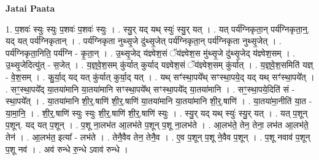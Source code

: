 \documentclass[17pt]{extarticle}
\begin{document}
\textbf{Jatai Paata} \newline

1. प॒शवः॑ स्युः स्युः प॒शवः॑ प॒शवः॑ स्युः । . स्यु॒र् यद् यथ् स्युः॑ स्यु॒र् यत् । . यत् पर्य॑ग्निकृता॒न् पर्य॑ग्निकृता॒न्॒. यद् यत् पर्य॑ग्निकृतान् । . पर्य॑ग्निकृता नुथ्सृ॒जे दु॑थ्सृ॒जेत् पर्य॑ग्निकृता॒न् पर्य॑ग्निकृता नुथ्सृ॒जेत् । . पर्य॑ग्निकृता॒निति॒ पर्य॑ग्नि - कृ॒ता॒न् । . उ॒थ्सृ॒जेद् य॑ज्ञ्वेश॒सं ॅय॑ज्ञ्वेश॒स मु॑थ्सृ॒जे दु॑थ्सृ॒जेद् य॑ज्ञ्वेश॒सम् । . उ॒थ्सृ॒जेदित्यु॑त् - स॒जेत् । . य॒ज्ञ्॒वे॒श॒सम् कु॑र्यात् कुर्याद् यज्ञ्वेश॒सं ॅय॑ज्ञ्वेश॒सम् कु॑र्यात् । . य॒ज्ञ्॒वे॒श॒समिति॑ यज्ञ् - वे॒श॒सम् । . कु॒र्या॒द् यद् यत् कु॑र्यात् कुर्या॒द् यत् । . यथ् सꣳ॑स्था॒पये᳚थ् सꣳस्था॒पये॒द् यद् यथ् सꣳ॑स्था॒पये᳚त् । . सꣳ॒॒स्था॒पये᳚द् या॒तया॑मानि या॒तया॑मानि सꣳस्था॒पये᳚थ् सꣳस्था॒पये᳚द् या॒तया॑मानि । . सꣳ॒॒स्था॒पये॒दिति॑ सं - स्था॒पये᳚त् । . या॒तया॑मानि शी॒र्॒.षाणि॑ शी॒र्॒.षाणि॑ या॒तया॑मानि या॒तया॑मानि शी॒र्॒.षाणि॑ । . या॒तया॑मा॒नीति॑ या॒त - या॒मा॒नि॒ । . शी॒र्॒.षाणि॑ स्युः स्युः शी॒र्॒.षाणि॑ शी॒र्॒.षाणि॑ स्युः । . स्यु॒र् यद् यथ् स्युः॑ स्यु॒र् यत् । . यत् प॒शून् प॒शून्. यद् यत् प॒शून् । . प॒शू ना॒लभ॑त आ॒लभ॑ते प॒शून् प॒शू ना॒लभ॑ते । . आ॒लभ॑ते॒ तेन॒ तेना॒ लभ॑त आ॒लभ॑ते॒ तेन॑ । . आ॒लभ॑त॒ इत्या᳚ - लभ॑ते । . तेनै॒वैव तेन॒ तेनै॒व । . ए॒व प॒शून् प॒शू ने॒वैव प॒शून् । . प॒शू नवाव॑ प॒शून् प॒शू नव॑ । . अव॑ रुन्धे रु॒न्धे ऽवाव॑ रुन्धे । \newline
\end{document}
